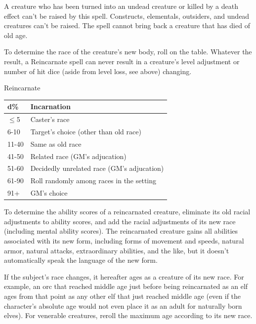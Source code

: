 A creature who has been turned into an undead creature or killed by a death effect can't be raised by this spell. 
Constructs, elementals, outsiders, and undead creatures can't be raised. 
The spell cannot bring back a creature that has died of old age.

To determine the race of the creature's new body, roll on the  table.
Whatever the result, a Reincarnate spell can never result in a creature's level adjustment or number of hit dice
(aside from level loss, see above) changing.
\begin{tableonecolumn}
\caption{Reincarnate}
\label{tab:Reincarnate}
\begin{tabular}{|l|l|}
\hline
d\%&Incarnation\\
\hline
$\leq$5&Caster's race\\
6-10&Target's choice (other than old race)\\
11-40&Same as old race\\
41-50&Related race (GM's adjucation)\\
51-60&Decidedly unrelated race (GM's adjucation)\\
61-90&Roll randomly among races in the setting\\
91+&GM's choice\\
\hline
\end{tabular}
\end{tableonecolumn}
To determine the ability scores of a reincarnated creature, eliminate its old racial adjustments to ability scores,
and add the racial adjustments of its new race (including mental ability scores).
The reincarnated creature gains all abilities associated with its new form, 
including forms of movement and speeds, natural armor, natural attacks, extraordinary abilities, and the like, 
but it doesn't automatically speak the language of the new form. 

If the subject's race changes, it hereafter ages as a creature of its new race.
For example, an orc that reached middle age just before being reincarnated as an elf ages from that point as any other elf
that just reached middle age (even if the character's absolute age would not even place it as an adult for naturally born elves).
For venerable creatures, reroll the maximum age according to its new race.

